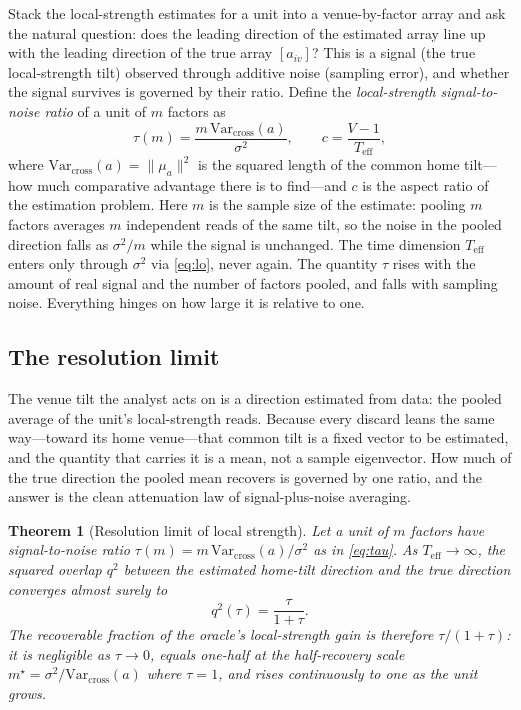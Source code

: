 \documentclass[12pt]{article}
\theoremstyle{plain}
\newtheorem{theorem}{Theorem}
\theoremstyle{definition}
\newcommand{\Var}{\mathrm{Var}}
\begin{document}
Stack the local-strength estimates for a unit into a venue-by-factor array and
ask the natural question: does the leading direction of the estimated array line
up with the leading direction of the true array $[a_{iv}]$? This is a signal
(the true local-strength tilt) observed through additive noise (sampling error),
and whether the signal survives is governed by their ratio. Define the
\emph{local-strength signal-to-noise ratio} of a unit of $m$ factors as
\begin{equation}
\tau(m)=\frac{m\,\Var_{\text{cross}}(a)}{\sigma^2},
\qquad c=\frac{V-1}{T_{\text{eff}}},
\label{eq:tau}
\end{equation}
where $\Var_{\text{cross}}(a)=\lVert\mu_a\rVert^2$ is the squared length of the
common home tilt---how much comparative advantage there is to find---and $c$ is
the aspect ratio of the estimation problem. Here $m$ is the sample size of the
estimate: pooling $m$ factors averages $m$ independent reads of the same tilt, so
the noise in the pooled direction falls as $\sigma^2/m$ while the signal is
unchanged. The time dimension $T_{\text{eff}}$ enters only through $\sigma^2$ via
\eqref{eq:lo}, never again. The quantity $\tau$ rises with the amount of real
signal and the number of factors pooled, and falls with sampling noise.
Everything hinges on how large it is relative to one.

\subsection{The resolution limit}

The venue tilt the analyst acts on is a direction estimated from data: the pooled
average of the unit's local-strength reads. Because every discard leans the same
way---toward its home venue---that common tilt is a fixed vector to be estimated,
and the quantity that carries it is a mean, not a sample eigenvector. How much of
the true direction the pooled mean recovers is governed by one ratio, and the
answer is the clean attenuation law of signal-plus-noise averaging.

\begin{theorem}[Resolution limit of local strength]
\label{thm:bbp}
Let a unit of $m$ factors have signal-to-noise ratio $\tau(m)=m\,
\Var_{\text{cross}}(a)/\sigma^2$ as in \eqref{eq:tau}. As $T_{\text{eff}}\to\infty$,
the squared overlap $q^2$ between the estimated home-tilt direction and the true
direction converges almost surely to
\begin{equation}
q^2(\tau)=\frac{\tau}{1+\tau}.
\label{eq:q2}
\end{equation}
The recoverable fraction of the oracle's local-strength gain is therefore
$\tau/(1+\tau)$: it is negligible as $\tau\to0$, equals one-half at the
half-recovery scale $m^\star=\sigma^2/\Var_{\text{cross}}(a)$ where $\tau=1$, and
rises continuously to one as the unit grows.
\end{theorem}
\end{document}
